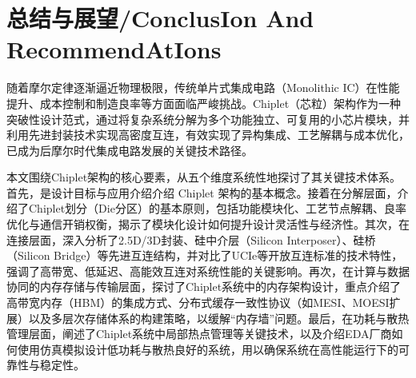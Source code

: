 \section{总结与展望/ConclusIon And RecommendAtIons}

随着摩尔定律逐渐逼近物理极限，传统单片式集成电路（Monolithic IC）在性能提升、成本控制和制造良率等方面面临严峻挑战。Chiplet（芯粒）架构作为一种突破性设计范式，通过将复杂系统分解为多个功能独立、可复用的小芯片模块，并利用先进封装技术实现高密度互连，有效实现了异构集成、工艺解耦与成本优化，已成为后摩尔时代集成电路发展的关键技术路径。

本文围绕Chiplet架构的核心要素，从五个维度系统性地探讨了其关键技术体系。首先，是设计目标与应用介绍介绍 Chiplet 架构的基本概念。接着在分解层面，介绍了Chiplet划分（Die分区）的基本原则，包括功能模块化、工艺节点解耦、良率优化与通信开销权衡，揭示了模块化设计如何提升设计灵活性与经济性。其次，在连接层面，深入分析了2.5D/3D封装、硅中介层（Silicon Interposer）、硅桥（Silicon Bridge）等先进互连结构，并对比了UCIe等开放互连标准的技术特性，强调了高带宽、低延迟、高能效互连对系统性能的关键影响。再次，在计算与数据协同的内存存储与传输层面，探讨了Chiplet系统中的内存架构设计，重点介绍了高带宽内存（HBM）的集成方式、分布式缓存一致性协议（如MESI、MOESI扩展）以及多层次存储体系的构建策略，以缓解“内存墙”问题。最后，在功耗与散热管理层面，阐述了Chiplet系统中局部热点管理等关键技术，以及介绍EDA厂商如何使用仿真模拟设计低功耗与散热良好的系统，用以确保系统在高性能运行下的可靠性与稳定性。

